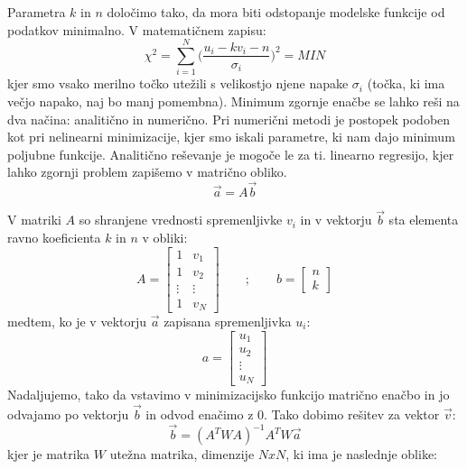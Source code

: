 \documentclass[slovene,11pt,a4paper]{article}
\numberwithin{equation}{section} %
\numberwithin{figure}{section} %
\numberwithin{table}{section} %
\begin{document}
Parametra $k$ in $n$ določimo tako, da mora biti odstopanje modelske funkcije od podatkov minimalno. V matematičnem zapisu:
\begin{equation}
\label{hi-minimum}
\chi^2 =\sum_{i=1}^N \bigg( \frac{u_{i}- k v_i -n }{\sigma_i} \bigg) ^2 = MIN
\end{equation}
kjer smo vsako merilno točko utežili s velikostjo njene napake $\sigma_i$ (točka, ki ima večjo napako, naj bo manj pomembna). Minimum zgornje enačbe se lahko reši na dva načina: analitično in numerično. Pri numerični metodi je postopek podoben kot pri nelinearni minimizacije, kjer smo iskali parametre, ki nam dajo minimum poljubne funkcije. Analitično reševanje je mogoče le za ti. linearno regresijo, kjer lahko zgornji problem zapišemo v matrično obliko.
\begin{equation}
\vec{a} = A \vec{b}
\end{equation}

V matriki $A$ so shranjene vrednosti spremenljivke $v_i$ in v vektorju $\vec{b}$ sta elementa ravno koeficienta $k$ in $n$ v obliki:
\begin{equation*}
A=
\begin{bmatrix}
    1 & v_1 \\
    1 & v_2 \\
    \vdots & \vdots  \\
    1 & v_N
\end{bmatrix}
\qquad  ;\qquad 
b=
\begin{bmatrix}
    n\\
    k
\end{bmatrix}
\end{equation*}
medtem, ko je v  vektorju $\vec{a} $ zapisana spremenljivka $u_i$:
\begin{equation*}
a=
\begin{bmatrix}
    u_1\\
    u_2\\
    \vdots \\
    u_N
\end{bmatrix}
\end{equation*}
Nadaljujemo, tako da vstavimo v minimizacijsko funkcijo matrično enačbo in jo odvajamo po vektorju $\vec{b}$ in odvod enačimo z $0$. Tako dobimo rešitev za vektor $\vec{v}$:
\begin{equation}
\label{resitev-koeficientov}
\vec{b}=(A^T W A)^{-1} A^T W \vec{a}
\end{equation}
kjer je matrika $W$ utežna matrika, dimenzije $NxN$, ki ima je naslednje oblike:
\end{document}
